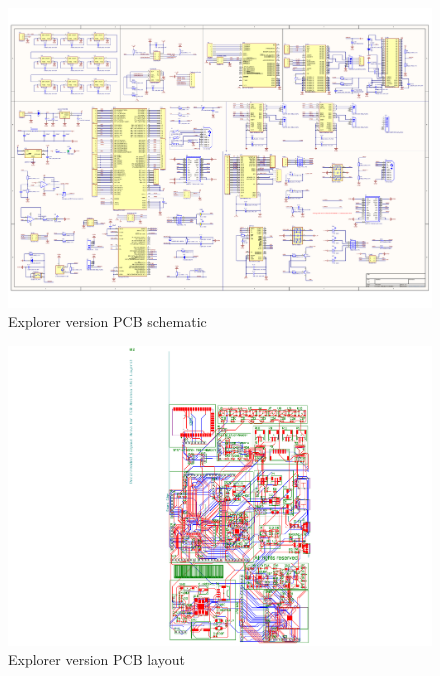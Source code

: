 \documentclass[sigconf]{acmart}
\begin{document}
\begin{figure}[h]
  \centering
  \includegraphics[width=\linewidth]{Misaka-v1-1.pdf}
  \caption{Explorer version PCB schematic}
  \label{fig:Explorer-schematic}
\end{figure}


\begin{figure}[h]
  \centering
  \includegraphics[width=\linewidth]{Misaka-v1-2.pdf}
  \caption{Explorer version PCB layout}
  \label{fig:Explorer-layout}
\end{figure}
\end{document}
